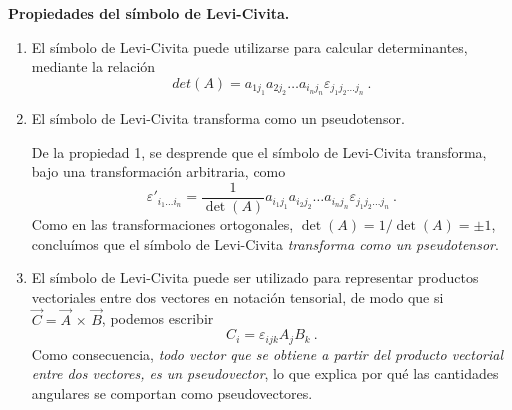 \begin{propiedad}
    \textbf{Propiedades del símbolo de Levi-Civita.}

    \begin{enumerate}
        \item El símbolo de Levi-Civita puede utilizarse para calcular determinantes, mediante la relación
        \begin{equation}
            det(A) = a_{1 j_1} a_{2 j_2} \dots a_{i_n j_n} \varepsilon_{j_1 j_2 \dots j_n} \ .
        \end{equation}

        \item El símbolo de Levi-Civita transforma como un pseudotensor.
        
        De la propiedad 1, se desprende que el símbolo de Levi-Civita transforma, bajo una transformación arbitraria, como
        \begin{equation}
            \varepsilon'_{i_1 \dots i_n} = \frac{1}{\det(A)} a_{i_1 j_1} a_{i_2 j_2} \dots a_{i_n j_n} \varepsilon_{j_1 j_2 \dots j_n} \ .
        \end{equation}
        Como en las transformaciones ortogonales, $\det(A) = 1/\det(A) = \pm 1$, concluímos que el símbolo de Levi-Civita \emph{transforma como un pseudotensor}.

        \item El símbolo de Levi-Civita puede ser utilizado para representar productos vectoriales entre dos vectores en notación tensorial, de modo que si $\vec{C} = \vec{A} \, \times \, \vec{B}$, podemos escribir
        \begin{equation}
            C_i = \varepsilon_{ijk} A_j B_k \ .
        \end{equation}
        Como consecuencia, \emph{todo vector que se obtiene a partir del producto vectorial entre dos vectores, es un pseudovector}, lo que explica por qué las cantidades angulares se comportan como pseudovectores.


\end{enumerate}
\end{propiedad}
